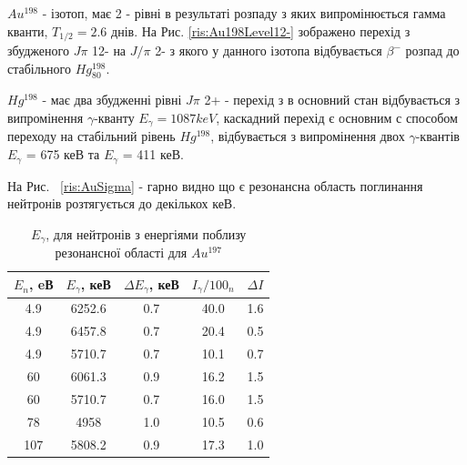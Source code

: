 \documentclass[a4paper, 14pt]{article}
\numberwithin{equation}{section}
\numberwithin{table}{section}
\begin{document}
	$Au^{198} $ - ізотоп, має 2 - рівні в результаті розпаду з яких випромінюється гамма кванти, $T_{1/2} = 2.6$ днів. На Рис. \ref{ris:Au198Level12-} зображено перехід з збудженого $J\pi$ 12- на $J/\pi$ 2- з якого у данного ізотопа відбувається $\beta^-$ розпад до стабільного $Hg^{198}_{80}$.
	
	$Hg^{198}$ - має два збудженні рівні $J\pi$ 2+ - перехід з  в основний стан відбувається з випромінення $\gamma$-кванту $E_\gamma=1087keV$, каскадний перехід є основним с способом переходу на стабільний рівень $Hg^{198}$, відбувається з випромінення двох $\gamma$-квантів $E_\gamma$ = 675 кеВ та $E_\gamma$ = 411 кеВ. 
	
	На Рис. ~\ref{ris:AuSigma} - гарно видно що є резонансна область поглинання нейтронів розтягується до декількох кеВ. 
	\begin{table}[h]
		\centering
		\begin{tabular}{|c|c|c|c|c|} 
			\hline
			$E_{n}$, eВ&$E_{\gamma}$, кеВ & $\Delta{E_{\gamma}}$, кеВ & $I_{\gamma} / 100_n$ & $\Delta{I}$ \\
			\hline
			4.9 & 6252.6 & 0.7 & 40.0 & 1.6 \\
			\hline
			4.9 & 6457.8 & 0.7 & 20.4 & 0.5\\	
			\hline
			4.9 & 5710.7 & 0.7 & 10.1 & 0.7 \\	
			\hline	%
			60 & 6061.3 & 0.9 & 16.2 & 1.5 \\	
			\hline %
			60 & 5710.7 & 0.7 & 16.0 & 1.5 \\	
			\hline %
			78 & 4958 & 1.0 & 10.5 & 0.6\\	
			\hline%
			107 & 5808.2 & 0.9 & 17.3 & 1.0 \\	
			\hline
		\end{tabular}
		\caption{$E_\gamma$, для нейтронів з енергіями поблизу резонансної області для $Au^{197}$} 
		\label{tabl:AuNeutronAbsorption}
	\end{table}
	
\end{document}
